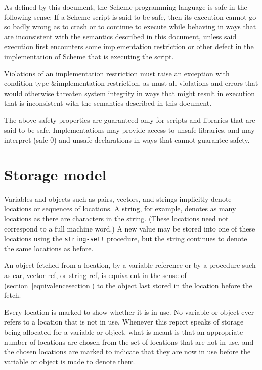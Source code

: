 As defined by this document, the Scheme programming language
is safe in the following sense:
If a Scheme script is said to be safe, then its execution
cannot go so badly wrong as to crash or to continue to
execute while behaving in ways that are
inconsistent with the semantics described in this document,
unless said execution first encounters some implementation
restriction or other defect in the implementation of Scheme
that is executing the script.

Violations of an implementation restriction must raise an
exception with condition type {\cf\&implementation-restriction},
as must all
violations and errors that would otherwise threaten system
integrity in ways that might result in execution that is
inconsistent with the semantics described in this document.

The above safety properties are guaranteed only for scripts
and libraries that are said to be safe.  Implementations
may provide access to unsafe libraries, and may interpret
{\cf (safe 0)} and {\cf unsafe} declarations in ways that
cannot guarantee safety.


\section{Storage model}
\label{storagemodel}

Variables and objects such as pairs, vectors, and strings implicitly
denote locations or sequences of locations.  A string, for
example, denotes as many locations as there are characters in the string. 
(These locations need not correspond to a full machine word.) A new value may be
stored into one of these locations using the {\tt string-set!} procedure, but
the string continues to denote the same locations as before.

An object fetched from a location, by a variable reference or by
a procedure such as {\cf car}, {\cf vector-ref}, or {\cf string-ref}, is
equivalent in the sense of  %
(section~\ref{equivalencesection})
to the object last stored in the location before the fetch.

Every location is marked to show whether it is in use.
No variable or object ever refers to a location that is not in use.
Whenever this report speaks of storage being allocated for a variable
or object, what is meant is that an appropriate number of locations are
chosen from the set of locations that are not in use, and the chosen
locations are marked to indicate that they are now in use before the variable
or object is made to denote them.

